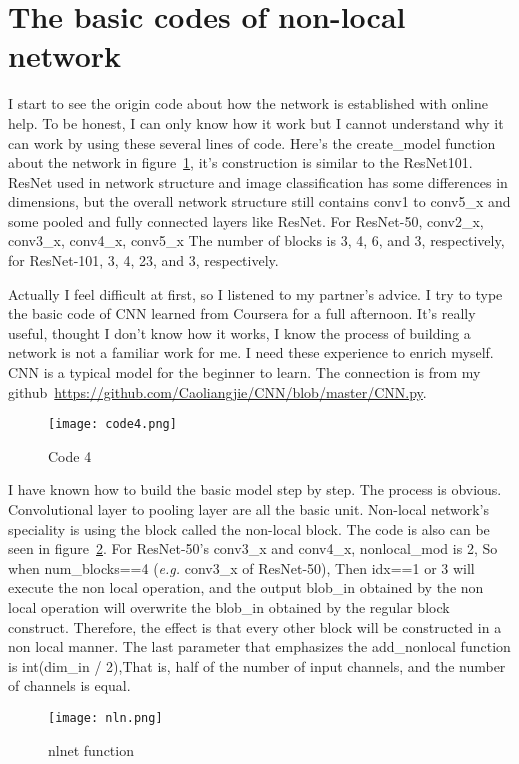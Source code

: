 \documentclass[10pt,letterpaper]{article}
\begin{document}
\section{The basic codes of non-local network}
I start to see the origin code about how the network is established with online help. To be honest, I can only know how it work but I cannot understand why it can work by using these several lines of code. Here's the create\_model function about the network in figure~\ref{f7}, it's construction is similar to the ResNet101. ResNet used in network structure and image classification has some differences in dimensions, but the overall network structure still contains conv1 to conv5\_x and some pooled and fully connected layers like ResNet. For ResNet-50, conv2\_x, conv3\_x, conv4\_x, conv5\_x The number of blocks is 3, 4, 6, and 3, respectively, for ResNet-101, 3, 4, 23, and 3, respectively.
\par Actually I feel difficult at first, so I listened to my partner's advice. I try to type the basic code of CNN learned from Coursera for a full afternoon. It's really useful, thought I don't know how it works, I know the process of building a network is not a familiar work for me. I need these experience to enrich myself. CNN is a typical model for the beginner to learn. The connection is from my github~\url{https://github.com/Caoliangjie/CNN/blob/master/CNN.py}. 
  \begin{figure}[!htb]
  	\centering
  	\texttt{[image: code4.png]}\\
  	\caption{Code 4}\label{f7}
  \end{figure}
\par I have known how to build the basic model step by step. The process is obvious. Convolutional layer to pooling layer are all the basic unit. Non-local network's speciality is using the block called the non-local block. The code is also can be seen in figure~\ref{f9}. For ResNet-50's conv3\_x and conv4\_x, nonlocal\_mod is 2, So when num\_blocks==4 (\emph{e.g.} conv3\_x of ResNet-50), Then idx==1 or 3 will execute the non local operation, and the output blob\_in obtained by the non local operation will overwrite the blob\_in obtained by the regular block construct. Therefore, the effect is that every other block will be constructed in a non local manner. The last parameter that emphasizes the add\_nonlocal function is int(dim\_in / 2),That is, half of the number of input channels, and the number of channels is equal.
  \begin{figure}[!htb]
  	\centering
  	\texttt{[image: nln.png]}\\
  	\caption{nlnet function}\label{f9}
  \end{figure}
\end{document}
